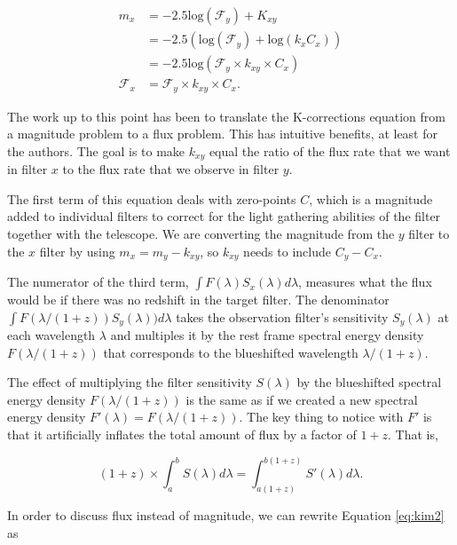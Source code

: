 \documentclass{article}
\begin{document}
\begin{equation}
\begin{aligned}
            m_x &= -2.5 \text{log}(\mathcal{F}_y) + K_{xy} \\
                &= -2.5 \left( \text{log}(\mathcal{F}_y) + \text{log}(k_x C_x) \right) \\
                &= -2.5 \text{log}(\mathcal{F}_y \times k_{xy} \times C_x) \\
  \mathcal{F}_x &= \mathcal{F}_y \times k_{xy} \times C_x .
\end{aligned}
\end{equation}

The work up to this point has been to translate the K-corrections equation from
a magnitude problem to a flux problem. This has intuitive benefits, at least
for the authors. The goal is to make $k_{xy}$ equal the ratio of the flux rate
that we want in filter $x$ to the flux rate that we observe in filter $y$.


The first term of this equation deals with zero-points $C$, which is a
magnitude added to individual filters to correct for the light gathering
abilities of the filter together with the telescope. We are converting the
magnitude from the $y$ filter to the $x$ filter by using $m_x = m_y - k_{xy}$,
so $k_{xy}$ needs to include $C_y - C_x$.

The numerator of the third term, $\int F(\lambda)S_x(\lambda)d\lambda$,
measures what the flux would be if there was no redshift in the target filter.
The denominator $\int F(\lambda/(1+z))S_y(\lambda))d\lambda$ takes the
observation filter's sensitivity $S_y(\lambda)$ at each wavelength $\lambda$
and multiples it by the rest frame spectral energy density $F(\lambda/(1+z))$
that corresponds to the blueshifted wavelength $\lambda / (1+z)$.

The effect of
multiplying the filter sensitivity $S(\lambda)$ by the blueshifted spectral energy density $F(\lambda / (1+z))$ is the same as if we created a new
spectral energy density $F'(\lambda) = F(\lambda / (1+z))$. The key thing to
notice with $F'$ is that it artificially inflates the total amount of flux by a
factor of $1 + z$. That is,

\begin{equation}
(1+z) \times \int_{a}^{b} S(\lambda) d\lambda = \int_{a(1+z)}^{b(1+z)} S'(\lambda) d\lambda .
\end{equation}

In order to discuss flux instead of magnitude, we can rewrite Equation \ref{eq:kim2} as
\end{document}

